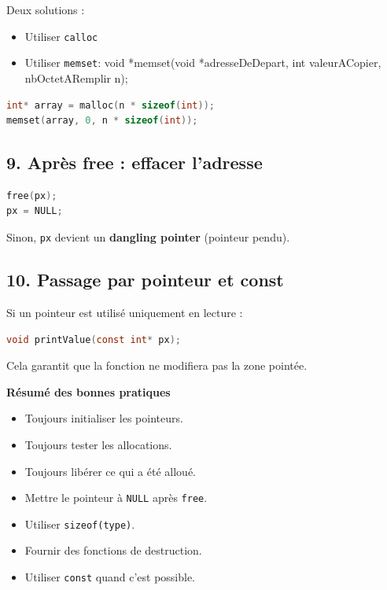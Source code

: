 Deux solutions :

\begin{itemize}
    \item Utiliser \texttt{calloc}
    \item Utiliser \texttt{memset}: void *memset(void *adresseDeDepart, int valeurACopier, nbOctetARemplir n);
\end{itemize}

\begin{lstlisting}[language=C]
int* array = malloc(n * sizeof(int));
memset(array, 0, n * sizeof(int));
\end{lstlisting}

\subsection{9. Après free : effacer l’adresse}

\begin{lstlisting}[language=C]
free(px);
px = NULL;
\end{lstlisting}

Sinon, \texttt{px} devient un \textbf{dangling pointer}
(pointeur pendu).

\subsection{10. Passage par pointeur et const}

Si un pointeur est utilisé uniquement en lecture :

\begin{lstlisting}[language=C]
void printValue(const int* px);
\end{lstlisting}

Cela garantit que la fonction ne modifiera pas la zone pointée.

\textbf{Résumé des bonnes pratiques}

\begin{itemize}
    \item Toujours initialiser les pointeurs.
    \item Toujours tester les allocations.
    \item Toujours libérer ce qui a été alloué.
    \item Mettre le pointeur à \texttt{NULL} après \texttt{free}.
    \item Utiliser \texttt{sizeof(type)}.
    \item Fournir des fonctions de destruction.
    \item Utiliser \texttt{const} quand c’est possible.
\end{itemize}

